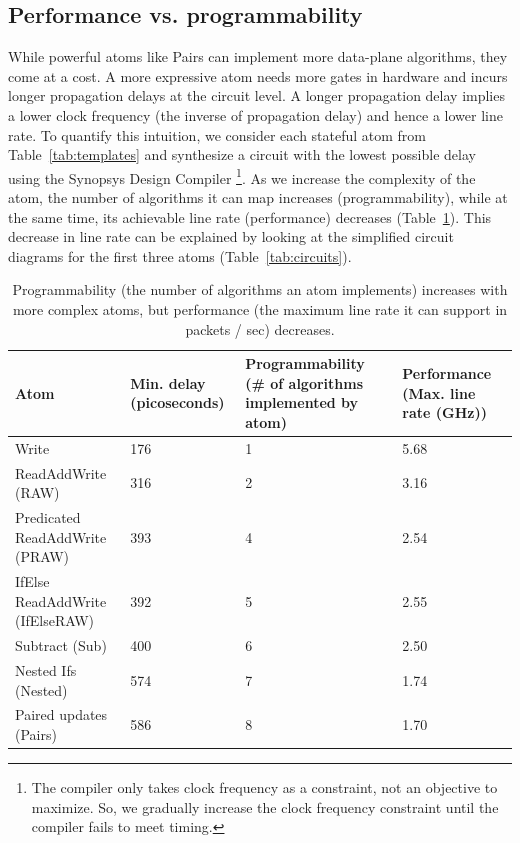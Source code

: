 \subsection{Performance vs. programmability}
\label{ss:perfprog}

While powerful atoms like Pairs can implement more data-plane algorithms, they
come at a cost.  A more expressive atom needs more gates in hardware and incurs
longer propagation delays at the circuit level. A longer propagation delay
implies a lower clock frequency (the inverse of propagation delay) and hence a
lower line rate. To quantify this intuition, we consider each stateful atom
from Table~\ref{tab:templates} and synthesize a circuit with the lowest
possible delay using the Synopsys Design Compiler \footnote{The compiler only
  takes clock frequency as a constraint, not an objective to maximize. So, we
gradually increase the clock frequency constraint until the compiler fails to
meet timing.}. As we increase the complexity of the atom, the number of
algorithms it can map increases (programmability), while at the same time, its
achievable line rate (performance) decreases (Table~\ref{tab:perfprog}). This
decrease in line rate can be explained by looking at the simplified circuit
diagrams for the first three atoms (Table~\ref{tab:circuits}).

\begin{table}[!t]
  \begin{scriptsize}
  \begin{tabular}{|p{}|p{}|p{}|p{}|}
  \hline
  Atom & Min. delay (picoseconds) & Programmability (\# of algorithms implemented by atom) & Performance (Max. line rate (GHz)) \\
  \hline
  Write & 176 & 1  & 5.68 \\
  \hline
  ReadAddWrite (RAW) & 316 & 2 & 3.16\\
  \hline
  \pbox{0.1\textwidth}
  {Predicated\\
  ReadAddWrite (PRAW)} & 393 & 4 & 2.54 \\
  \hline
  IfElse ReadAddWrite (IfElseRAW) & 392 & 5 & 2.55 \\
  \hline
  Subtract (Sub) & 400 & 6 & 2.50 \\
  \hline
  Nested Ifs (Nested) & 574 & 7 & 1.74 \\
  \hline
  Paired updates (Pairs) & 586 & 8 & 1.70 \\
  \hline
  \end{tabular}
\end{scriptsize}
\caption{Programmability (the number of algorithms an atom implements)
  increases with more complex atoms, but performance (the maximum line
rate it can support in packets / sec) decreases.}
  \label{tab:perfprog}
\end{table}


